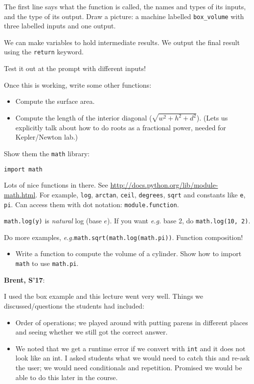\documentclass{article}
\newcommand{\eg}{\emph{e.g.}\xspace}
\newenvironment{reflect}[1]
{
  \noindent
  \begin{lrbox}{\reflectbox}
    \begin{minipage}[t]{\textwidth}
      \textbf{#1}:
}{
    \end{minipage}
  \end{lrbox}
  \fbox{\usebox{\reflectbox}}
}
\begin{document}
The first line says what the function is called, the names and types
of its inputs, and the type of its output.  Draw a picture: a machine
labelled \verb|box_volume| with three labelled inputs and one
output.

We can make variables to hold intermediate results.  We output the
final result using the \verb|return| keyword.

Test it out at the prompt with different inputs!

Once this is working, write some other functions:
\begin{itemize}
\item Compute the surface area.
\item Compute the length of the interior diagonal
  ($\sqrt{w^2 + h^2 + d^2}$).  (Lets us explicitly talk about how to do
  roots as a fractional power, needed for Kepler/Newton lab.)
\end{itemize}

Show them the \verb|math| library:

\begin{verbatim}
import math
\end{verbatim}

Lots of nice functions in there.  See
\url{http://docs.python.org/lib/module-math.html}.  For example,
\verb|log|, \verb|arctan|, \verb|ceil|, \verb|degrees|, \verb|sqrt|
and constants like \verb|e|, \verb|pi|.  Can access them with dot
notation: \verb|module.function|.

\verb|math.log(y)| is \emph{natural} log (base $e$). If you want
\eg base 2, do \verb|math.log(10, 2)|.

Do more examples, \eg \verb|math.sqrt(math.log(math.pi))|.  Function
composition!

\begin{itemize}
\item Write a function to compute the volume of a cylinder.  Show how
  to import \texttt{math} to use \texttt{math.pi}.
\end{itemize}

\begin{reflect}{Brent, S'17}
  I used the box example and this lecture went very well.  Things we
  discussed/questions the students had included:

  \begin{itemize}
  \item Order of operations; we played around with putting parens in
    different places and seeing whether we still got the correct
    answer.
  \item We noted that we get a runtime error if we convert with
    \verb|int| and it does not look like an int.  I asked students
    what we would need to catch this and re-ask the user; we would
    need conditionals and repetition.  Promised we would be able to do
    this later in the course.
  \end{itemize}
\end{reflect}
\end{document}
